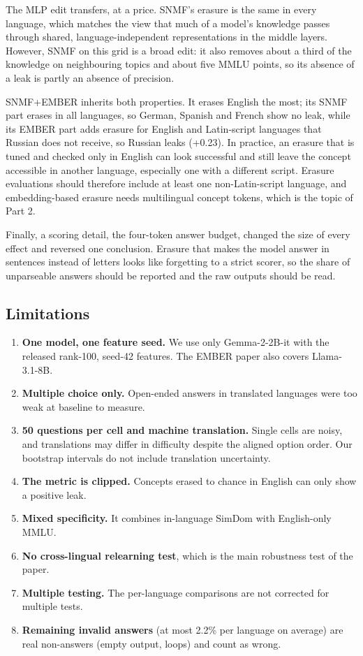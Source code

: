\documentclass[11pt]{article}
\begin{document}
The MLP edit transfers, at a price. SNMF's erasure is the same in every language, which matches the view that much of a model's knowledge passes through shared, language-independent representations in the middle layers. However, SNMF on this grid is a broad edit: it also removes about a third of the knowledge on neighbouring topics and about five MMLU points, so its absence of a leak is partly an absence of precision.

SNMF+EMBER inherits both properties. It erases English the most; its SNMF part erases in all languages, so German, Spanish and French show no leak, while its EMBER part adds erasure for English and Latin-script languages that Russian does not receive, so Russian leaks (+0.23). In practice, an erasure that is tuned and checked only in English can look successful and still leave the concept accessible in another language, especially one with a different script. Erasure evaluations should therefore include at least one non-Latin-script language, and embedding-based erasure needs multilingual concept tokens, which is the topic of Part 2.

Finally, a scoring detail, the four-token answer budget, changed the size of every effect and reversed one conclusion. Erasure that makes the model answer in sentences instead of letters looks like forgetting to a strict scorer, so the share of unparseable answers should be reported and the raw outputs should be read.

\subsection{Limitations}

\begin{enumerate}
\setlength\itemsep{1pt}
\item \textbf{One model, one feature seed.} We use only Gemma-2-2B-it with the released rank-100, seed-42 features. The EMBER paper also covers Llama-3.1-8B.
\item \textbf{Multiple choice only.} Open-ended answers in translated languages were too weak at baseline to measure.
\item \textbf{50 questions per cell and machine translation.} Single cells are noisy, and translations may differ in difficulty despite the aligned option order. Our bootstrap intervals do not include translation uncertainty.
\item \textbf{The metric is clipped.} Concepts erased to chance in English can only show a positive leak.
\item \textbf{Mixed specificity.} It combines in-language SimDom with English-only MMLU.
\item \textbf{No cross-lingual relearning test}, which is the main robustness test of the paper.
\item \textbf{Multiple testing.} The per-language comparisons are not corrected for multiple tests.
\item \textbf{Remaining invalid answers} (at most 2.2\% per language on average) are real non-answers (empty output, loops) and count as wrong.
\end{enumerate}
\end{document}
